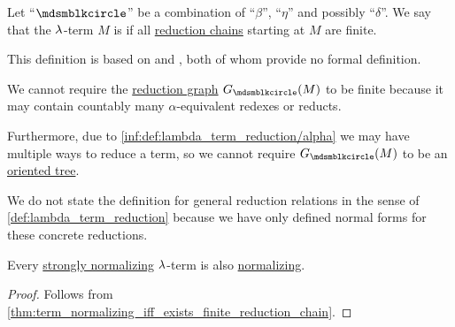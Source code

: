 \begin{definition}\label{def:strongly_normalizing_lambda_term}\mimprovised
  Let \enquote{\( {\Anon} \)} be a combination of \enquote{\( \beta \)}, \enquote{\( \eta \)} and possibly \enquote{\( \delta \)}. We say that the \( {\mathrm \lambda} \)-term \( M \) is  if all \hyperref[def:lambda_term_reduction_graph]{reduction chains} starting at \( M \) are finite.
\end{definition}
\begin{comments}
  \item This definition is based on  and , both of whom provide no formal definition.

  \item We cannot require the \hyperref[def:lambda_term_reduction_graph]{reduction graph} \( G_{\Anon}(M) \) to be finite because it may contain countably many \( \alpha \)-equivalent redexes or reducts.

  Furthermore, due to \ref{inf:def:lambda_term_reduction/alpha} we may have multiple ways to reduce a term, so we cannot require \( G_{\Anon}(M) \) to be an \hyperref[def:oriented_tree]{oriented tree}.

  \item We do not state the definition for general reduction relations in the sense of \ref{def:lambda_term_reduction} because we have only defined normal forms for these concrete reductions.
\end{comments}

\begin{proposition}\label{thm:strongly_normalizing_term_is_normalizing}
  Every \hyperref[def:strongly_normalizing_lambda_term]{strongly normalizing} \( {\mathrm \lambda} \)-term is also \hyperref[def:lambda_term_normal_form]{normalizing}.
\end{proposition}
\begin{proof}
  Follows from \cref{thm:term_normalizing_iff_exists_finite_reduction_chain}.
\end{proof}

